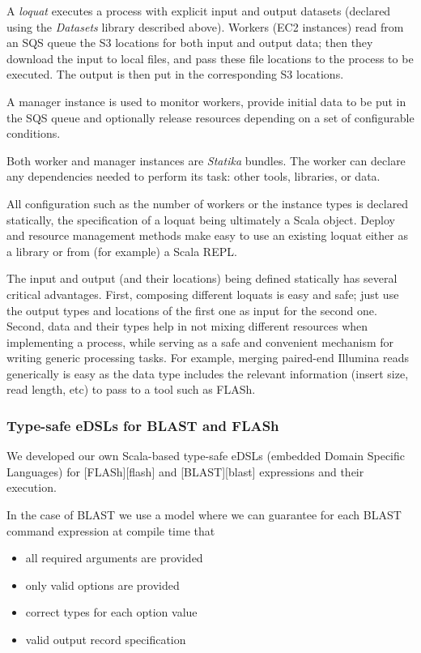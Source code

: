 \documentclass[fleqn,10pt,lineno]{wlpeerj}
\providecommand{\tightlist}{%
\setlength{\itemsep}{0pt}\setlength{\parskip}{0pt}}
\begin{document}
A \emph{loquat} executes a process with explicit input and output
datasets (declared using the \emph{Datasets} library described above).
Workers (EC2 instances) read from an SQS queue the S3 locations for both
input and output data; then they download the input to local files, and
pass these file locations to the process to be executed. The output is
then put in the corresponding S3 locations.

A manager instance is used to monitor workers, provide initial data to
be put in the SQS queue and optionally release resources depending on a
set of configurable conditions.

Both worker and manager instances are \emph{Statika} bundles. The worker
can declare any dependencies needed to perform its task: other tools,
libraries, or data.

All configuration such as the number of workers or the instance types is
declared statically, the specification of a loquat being ultimately a
Scala object. Deploy and resource management methods make easy to use an
existing loquat either as a library or from (for example) a Scala REPL.

The input and output (and their locations) being defined statically has
several critical advantages. First, composing different loquats is easy
and safe; just use the output types and locations of the first one as
input for the second one. Second, data and their types help in not
mixing different resources when implementing a process, while serving as
a safe and convenient mechanism for writing generic processing tasks.
For example, merging paired-end Illumina reads generically is easy as
the data type includes the relevant information (insert size, read
length, etc) to pass to a tool such as FLASh.

\subsubsection{Type-safe eDSLs for BLAST and
FLASh}\label{type-safe-edsls-for-blast-and-flash}

We developed our own Scala-based type-safe eDSLs (embedded Domain
Specific Languages) for {[}FLASh{]}{[}flash{]} \citep{magovc2011flash}
and {[}BLAST{]}{[}blast{]} \citep{camacho2009blast} expressions and
their execution.

In the case of BLAST we use a model where we can guarantee for each
BLAST command expression at compile time that

\begin{itemize}
\tightlist
\item
  all required arguments are provided
\item
  only valid options are provided
\item
  correct types for each option value
\item
  valid output record specification
\end{itemize}
\end{document}
